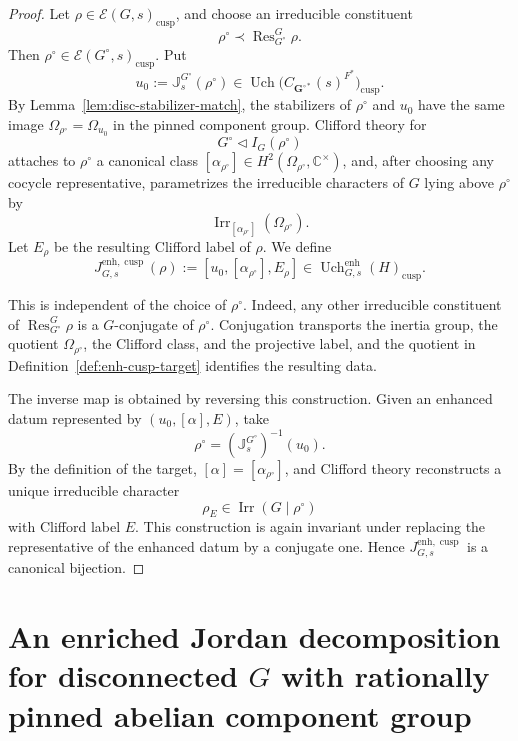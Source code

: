 \documentclass{amsart}
\theoremstyle{plain}
\numberwithin{equation}{section}
\theoremstyle{definition}
\newcommand{\cE}{\mathcal{E}}
\newcommand{\Res}{\operatorname{Res}}
\newcommand{\Irr}{\operatorname{Irr}}
\newcommand{\Uch}{\operatorname{Uch}}
\newcommand{\J}{\mathbb{J}}
\newcommand{\cusp}{\operatorname{cusp}}
\newcommand{\bG}{\mathbf{G}}
\newcommand{\C}{\mathbb{C}}
\begin{document}
\begin{proof}
Let \(\rho\in\cE(G,s)_{\cusp}\), and choose an irreducible constituent
\[
        \rho^\circ\prec\Res^G_{G^\circ}\rho .
\]
Then \(\rho^\circ\in\cE(G^\circ,s)_{\cusp}\).  Put
\[
        u_0:=\J_s^{G^\circ}(\rho^\circ)
        \in \Uch\bigl(C_{\bG^{\circ *}}(s)^{F^*}\bigr)_{\cusp}.
\]
By Lemma~\ref{lem:disc-stabilizer-match}, the stabilizers of \(\rho^\circ\) and
\(u_0\) have the same image \(\Omega_{\rho^\circ}=\Omega_{u_0}\) in the pinned
component group.  Clifford theory for
\[
        G^\circ\lhd I_G(\rho^\circ)
\]
attaches to \(\rho^\circ\) a canonical class
\([\alpha_{\rho^\circ}]\in H^2(\Omega_{\rho^\circ},\C^\times)\), and, after
choosing any cocycle representative, parametrizes the irreducible characters of
\(G\) lying above \(\rho^\circ\) by
\[
        \Irr_{[\alpha_{\rho^\circ}]}(\Omega_{\rho^\circ}).
\]
Let \(E_\rho\) be the resulting Clifford label of \(\rho\).  We define
\[
        J^{\mathrm{enh},\cusp}_{G,s}(\rho)
        :=
        [u_0,[\alpha_{\rho^\circ}],E_\rho]
        \in \Uch^{\mathrm{enh}}_{G,s}(H)_{\cusp}.
\]

This is independent of the choice of \(\rho^\circ\).  Indeed, any other
irreducible constituent of \(\Res^G_{G^\circ}\rho\) is a \(G\)-conjugate of
\(\rho^\circ\).  Conjugation transports the inertia group, the quotient
\(\Omega_{\rho^\circ}\), the Clifford class, and the projective label, and the
quotient in Definition~\ref{def:enh-cusp-target} identifies the resulting data.

The inverse map is obtained by reversing this construction.  Given an enhanced
datum represented by \((u_0,[\alpha],E)\), take
\[
        \rho^\circ=(\J_s^{G^\circ})^{-1}(u_0).
\]
By the definition of the target, \([\alpha]=[\alpha_{\rho^\circ}]\), and Clifford
theory reconstructs a unique irreducible character
\[
        \rho_E\in\Irr(G\mid\rho^\circ)
\]
with Clifford label \(E\).  This construction is again invariant under replacing
the representative of the enhanced datum by a conjugate one.  Hence
\(J^{\mathrm{enh},\cusp}_{G,s}\) is a canonical bijection.
\end{proof}


\section{An enriched Jordan decomposition for disconnected $G$ with rationally pinned abelian component group}
\label{sec:disc-full-JD}
\end{document}
